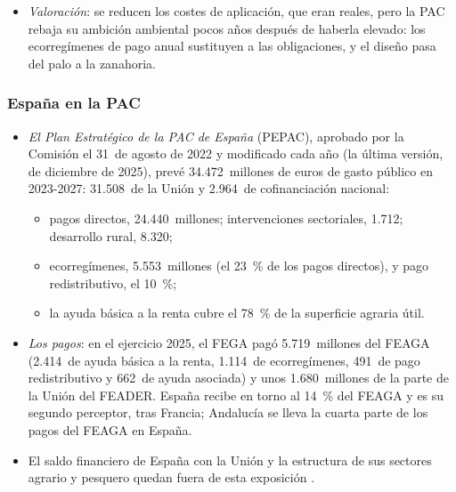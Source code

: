 \documentclass[11pt]{article}
\begin{document}
\begin{itemize}
  \begin{itemize}
  \item los pequeños agricultores pueden cobrar un pago global de hasta 3.000~euros al año, exentos de la condicionalidad;
  \item las explotaciones ecológicas se consideran cumplidoras de las BCAM correspondientes;
  \item como máximo un control sobre el terreno al año por explotación, y una ayuda única al desarrollo empresarial de hasta 75.000~euros;
  \item los pagos de crisis pasan al FEADER y la reserva agrícola queda para las perturbaciones del mercado.
  \item La Comisión estima el ahorro en 1.580~millones de euros al año para los agricultores y 210~millones para las administraciones\nocite{CE2026Preocupaciones}.
  \end{itemize}
\item \emph{Valoración}: se reducen los costes de aplicación, que eran reales, pero la PAC rebaja su ambición ambiental pocos años después de haberla elevado: los ecorregímenes de pago anual sustituyen a las obligaciones, y el diseño pasa del palo a la zanahoria.
\end{itemize}

\subsubsection{España en la PAC}\label{sec:espana-pac}

\begin{itemize}
\item \emph{El Plan Estratégico de la PAC de España} (PEPAC), aprobado por la Comisión el 31~de agosto de 2022 y modificado cada año (la última versión, de diciembre de 2025), prevé 34.472~millones de euros de gasto público en 2023-2027: 31.508~de la Unión y 2.964~de cofinanciación nacional\nocite{CE2025PEPAC}:
  \begin{itemize}
  \item pagos directos, 24.440~millones; intervenciones sectoriales, 1.712; desarrollo rural, 8.320;
  \item ecorregímenes, 5.553~millones (el 23~\% de los pagos directos), y pago redistributivo, el 10~\%;
  \item la ayuda básica a la renta cubre el 78~\% de la superficie agraria útil.
  \end{itemize}
\item \emph{Los pagos}: en el ejercicio 2025, el FEGA pagó 5.719~millones del FEAGA (2.414~de ayuda básica a la renta, 1.114~de ecorregímenes, 491~de pago redistributivo y 662~de ayuda asociada) y unos 1.680~millones de la parte de la Unión del FEADER\nocite{FEGA2026Informe}. España recibe en torno al 14~\% del FEAGA y es su segundo perceptor, tras Francia; Andalucía se lleva la cuarta parte de los pagos del FEAGA en España.
\item El saldo financiero de España con la Unión y la estructura de sus sectores agrario y pesquero quedan fuera de esta exposición  .
\end{itemize}
\end{document}

